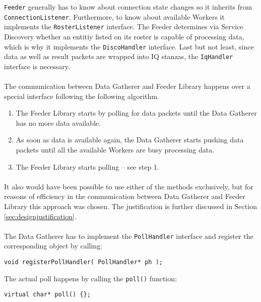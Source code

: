 \texttt{Feeder} generally has to know about connection state changes so it inherits from \texttt{ConnectionListener}. Furthermore, to know about available Workers it implements the \texttt{RosterListener} interface. The Feeder determines via Service Discovery whether an entitiy listed on its roster is capable of processing data, which is why it implements the \texttt{DiscoHandler} interface. Last but not least, since data as well as result packets are wrapped into IQ stanzas, the \texttt{IqHandler} interface is necessary.

\paragraph{}
The communication between Data Gatherer and Feeder Library happens over a special interface following the following algorithm.

\begin{enumerate}
\item The Feeder Library starts by polling for data packets until the Data Gatherer has no more data available.
\item As soon as data is available again, the Data Gatherer starts pushing data packets until all the available Workers are busy processing data.
\item The Feeder Library starts polling -- see step 1.
\end{enumerate}

\paragraph{}
It also would have been possible to use either of the methods exclusively, but for reasons of efficiency in the communication between Data Gatherer and Feeder Library this approach was chosen. The justification is further discussed in Section \ref{sec:designjustification}.

\paragraph{}
The Data Gatherer has to implement the \texttt{PollHandler} interface and register the corresponding object by calling:
\begin{flushleft}
\texttt{void registerPollHandler( PollHandler* ph );}
\end{flushleft}
The actual poll happens by calling the \texttt{poll()} function:
\begin{flushleft}
\texttt{virtual char* poll() \{\};}
\end{flushleft}


